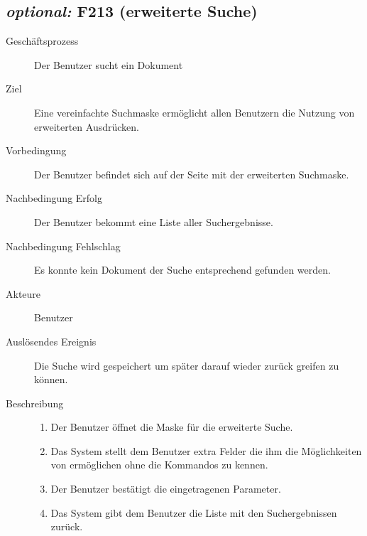 \subsection{\emph{optional:} F213 (erweiterte Suche)}
\label{F:n00bSuche}
\begin{description}
  \item[Geschäftsprozess]Der Benutzer sucht ein Dokument
  \item[Ziel]Eine vereinfachte Suchmaske ermöglicht allen Benutzern die Nutzung von erweiterten Ausdrücken.
  \item[Vorbedingung]Der Benutzer befindet sich auf der Seite mit der erweiterten Suchmaske.
  \item[Nachbedingung Erfolg]Der Benutzer bekommt eine Liste aller Suchergebnisse.
  \item[Nachbedingung Fehlschlag]Es konnte kein Dokument der Suche entsprechend gefunden werden.
  \item[Akteure]Benutzer
  \item[Auslösendes Ereignis]Die Suche wird gespeichert um später darauf wieder zurück greifen zu können.
  \item[Beschreibung]\hfill
    \begin{enumerate}
      \item Der Benutzer öffnet die Maske für die erweiterte Suche.
      \item Das System stellt dem Benutzer extra Felder die ihm die Möglichkeiten von  ermöglichen ohne die Kommandos zu kennen.
      \item Der Benutzer bestätigt die eingetragenen Parameter.
      \item Das System gibt dem Benutzer die Liste mit den Suchergebnissen zurück.
    \end{enumerate}
\end{description}


